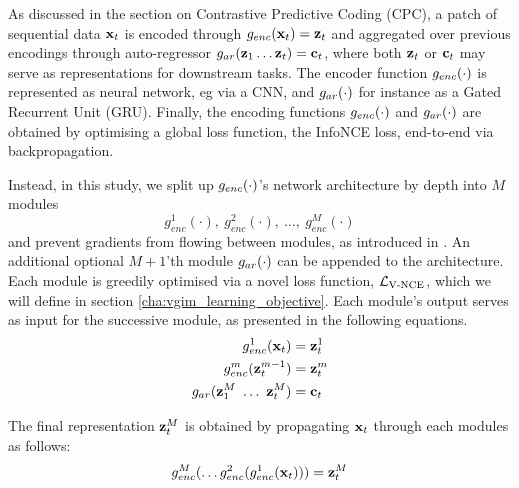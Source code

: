 		As discussed in the section on Contrastive Predictive Coding (CPC), a patch of sequential data $\mathbf{x}_t$ is encoded through $g_{enc}(\mathbf{x}_t) = \mathbf{z}_t$ and aggregated over previous encodings through auto-regressor $g_{ar}(\mathbf{z}_1  \dots \mathbf{z}_t) = \mathbf{c}_t$, where both $\mathbf{z}_t$ or $\mathbf{c}_t$ may serve as representations for downstream tasks. The encoder function $g_{enc}(\cdot)$ is represented as neural network, eg via a CNN, and $g_{ar}(\cdot)$ for instance as a Gated Recurrent Unit (GRU).
		Finally, the encoding functions $g_{enc}(\cdot)$ and $g_{ar}(\cdot)$ are obtained by optimising a global loss function, the InfoNCE loss, end-to-end via backpropagation. 

			Instead, in this study, we split up $g_{enc}(\cdot)$'s network architecture by depth into $M$ modules 
			$$g_{enc}^1(\cdot),~ g_{enc}^2(\cdot),~\dots,~g_{enc}^M(\cdot)$$ 
			and prevent gradients from flowing between modules, as introduced in \citep{lowePuttingEndEndtoEnd2020a}. An additional optional $M \! + \! 1$'th module $g_{ar}(\cdot)$ can be appended to the architecture. Each module is greedily optimised via a novel loss function, $\mathcal{L}_{\text{V-NCE}}$, which we will define in section \ref{cha:vgim_learning_objective}. Each module's output serves as input for the successive module, as presented in the following equations. %
			\begin{align*} %
				g_{enc}^1(\xt) &= \zt^1 \\
				g_{enc}^m(\zt^{m-1}) &= \zt^m \\
				g_{ar}(\z_1^M ~ \dots ~ \zt^M) &= \ct
			\end{align*}
			
			The final representation $\mathbf{z}_t^M$ is obtained by propagating $\mathbf{x}_t$ through each modules as follows:
			$$ g_{enc}^M ( \dots	g_{enc}^2(g_{enc}^1(\mathbf{x}_t))) = \mathbf{z}_t^M$$
			
			
			
					
